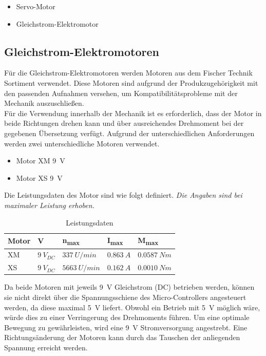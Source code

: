 \documentclass[conference,compsoc,final,a4paper]{IEEEtran}
\begin{document}
\begin{itemize}
	\item Servo-Motor
	\item Gleichstrom-Elektromotor
\end{itemize}

\subsection{Gleichstrom-Elektromotoren}
\noindent Für die Gleichstrom-Elektromotoren werden Motoren aus dem Fischer Technik Sortiment verwendet. 
Diese Motoren sind aufgrund der Produkzugehörigkeit mit den passenden Aufnahmen versehen, um Kompatibilitätsprobleme mit der Mechanik auszuschließen.
\\


\noindent Für die Verwendung innerhalb der Mechanik ist es erforderlich, dass der Motor in beide Richtungen drehen kann und über ausreichendes Drehmoment bei der gegebenen Übersetzung verfügt.
Aufgrund der unterschiedlichen Anforderungen werden zwei unterschiedliche Motoren verwendet.
\begin{itemize}
\item Motor XM \qty{9}{V}
\item Motor XS \qty{9}{V}
\end{itemize}

\noindent Die Leistungsdaten des Motor sind wie folgt definiert. 
\newline \textit{Die Angaben sind bei maximaler Leistung erhoben.}

\begin{table}[h]
  \caption{Leistungsdaten}
  \label{Leistungsdaten}
  \centering
  \begin{tabular}{lllll}
    \toprule
    \textbf{Motor} & \textbf{V} & \textbf{n\textsubscript{max}} & \textbf{I\textsubscript{max}} & \textbf{M\textsubscript{max}} \\ \hline
    \midrule
      XM \autocite{motorenXM} & $\qty{9}{V}_{DC}$ & $\qty{337}{U/min}$ & $\qty{0.863}{A}$ & $\qty{0.0587}{Nm}$ \\ 
      XS \autocite{motorenXS} & $\qty{9}{V}_{DC}$ & $\qty{5663}{U/min}$ & $\qty{0.162}{A}$ & $\qty{0.0010}{Nm}$ \\
    \bottomrule
  \end{tabular}
  \end{table}
  
\noindent Da beide Motoren mit jeweils \qty{9}{V} Gleichstrom (DC) betrieben werden, können sie nicht direkt über die Spannungsschiene des Micro-Controllers angesteuert werden, 
da diese maximal \qty{5}{V} liefert. Obwohl ein Betrieb mit \qty{5}{V} möglich wäre, würde dies zu einer Verringerung des Drehmoments führen. Um eine optimale Bewegung zu gewährleisten, 
wird eine \qty{9}{V} Stromversorgung angestrebt. Eine Richtungsänderung der Motoren kann durch das Tauschen der anliegenden Spannung erreicht werden.  
\end{document}
